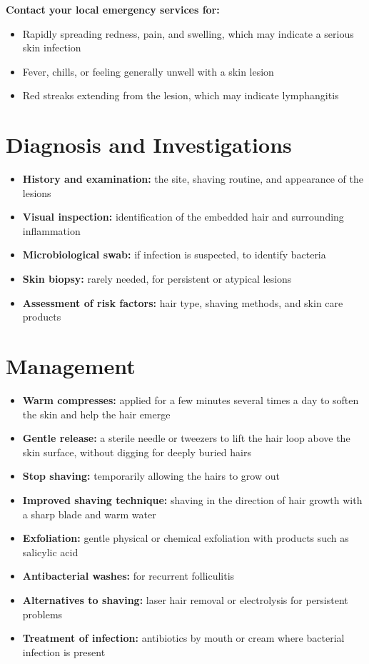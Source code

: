 \textbf{Contact your local emergency services for:}
\begin{itemize}
    \item Rapidly spreading redness, pain, and swelling, which may indicate a serious skin infection
    \item Fever, chills, or feeling generally unwell with a skin lesion
    \item Red streaks extending from the lesion, which may indicate lymphangitis
\end{itemize}

\section*{Diagnosis and Investigations}
\begin{itemize}
    \item \textbf{History and examination:} the site, shaving routine, and appearance of the lesions
    \item \textbf{Visual inspection:} identification of the embedded hair and surrounding inflammation
    \item \textbf{Microbiological swab:} if infection is suspected, to identify bacteria
    \item \textbf{Skin biopsy:} rarely needed, for persistent or atypical lesions
    \item \textbf{Assessment of risk factors:} hair type, shaving methods, and skin care products
\end{itemize}

\section*{Management}
\begin{itemize}
    \item \textbf{Warm compresses:} applied for a few minutes several times a day to soften the skin and help the hair emerge
    \item \textbf{Gentle release:} a sterile needle or tweezers to lift the hair loop above the skin surface, without digging for deeply buried hairs
    \item \textbf{Stop shaving:} temporarily allowing the hairs to grow out
    \item \textbf{Improved shaving technique:} shaving in the direction of hair growth with a sharp blade and warm water
    \item \textbf{Exfoliation:} gentle physical or chemical exfoliation with products such as salicylic acid
    \item \textbf{Antibacterial washes:} for recurrent folliculitis
    \item \textbf{Alternatives to shaving:} laser hair removal or electrolysis for persistent problems
    \item \textbf{Treatment of infection:} antibiotics by mouth or cream where bacterial infection is present
\end{itemize}

